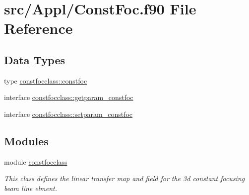 \hypertarget{_const_foc_8f90}{}\section{src/\+Appl/\+Const\+Foc.f90 File Reference}
\label{_const_foc_8f90}
\subsection*{Data Types}
\begin{DoxyCompactItemize}
\item 
type \mbox{\hyperlink{namespaceconstfocclass_structconstfocclass_1_1constfoc}{constfocclass\+::constfoc}}
\item 
interface \mbox{\hyperlink{interfaceconstfocclass_1_1getparam__constfoc}{constfocclass\+::getparam\+\_\+constfoc}}
\item 
interface \mbox{\hyperlink{interfaceconstfocclass_1_1setparam__constfoc}{constfocclass\+::setparam\+\_\+constfoc}}
\end{DoxyCompactItemize}
\subsection*{Modules}
\begin{DoxyCompactItemize}
\item 
module \mbox{\hyperlink{namespaceconstfocclass}{constfocclass}}
\begin{DoxyCompactList}\small\item\em This class defines the linear transfer map and field for the 3d constant focusing beam line elment. \end{DoxyCompactList}\end{DoxyCompactItemize}
